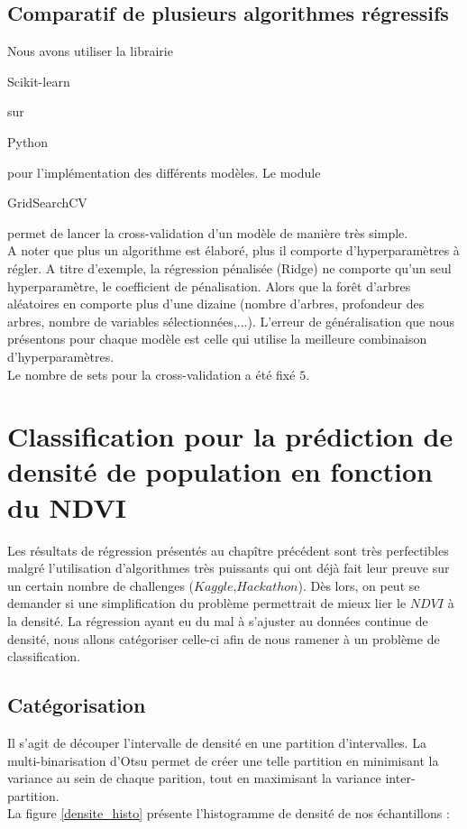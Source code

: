 \documentclass{book}
\begin{document}
\section{Comparatif de plusieurs algorithmes régressifs}

Nous avons utiliser la librairie \begin{itshape}Scikit-learn\end{itshape}\cite{scikit-learn} sur \begin{itshape}Python\end{itshape} 
pour l'implémentation des différents modèles. Le module \begin{itshape}GridSearchCV\end{itshape} permet de lancer
la cross-validation d'un modèle de manière très simple.\\
A noter que plus un algorithme est élaboré, plus il comporte d'hyperparamètres à régler. A titre d'exemple, la régression pénalisée (Ridge)
ne comporte qu'un seul hyperparamètre, le coefficient de pénalisation. Alors que la for\^{e}t d'arbres aléatoires en comporte plus d'une dizaine
(nombre d'arbres, profondeur des arbres, nombre de variables sélectionnées,...). L'erreur de généralisation que nous présentons pour chaque modèle 
est celle qui utilise la meilleure combinaison d'hyperparamètres.\\
Le nombre de sets pour la cross-validation a été fixé $5$.\\


\chapter{Classification pour la prédiction de densité de population en fonction du NDVI}

Les résultats de régression présentés au chapître précédent sont très perfectibles malgré l'utilisation d'algorithmes très puissants qui ont déjà fait leur
preuve sur un certain nombre de challenges ($Kaggle$,$Hackathon$). Dès lors, on peut se demander si une simplification du problème permettrait de mieux lier
le $NDVI$ à la densité. La régression ayant eu du mal à s'ajuster au données continue de densité, nous allons catégoriser celle-ci afin de nous ramener à un
problème de classification.

\section{Catégorisation}
Il s'agit de découper l'intervalle de densité en une partition d'intervalles. La multi-binarisation d'Otsu permet de créer une telle partition en
minimisant la variance au sein de chaque parition, tout en maximisant la variance inter-partition.\\
La figure \ref{densite_histo} présente l'histogramme de densité de nos échantillons :
\end{document}
